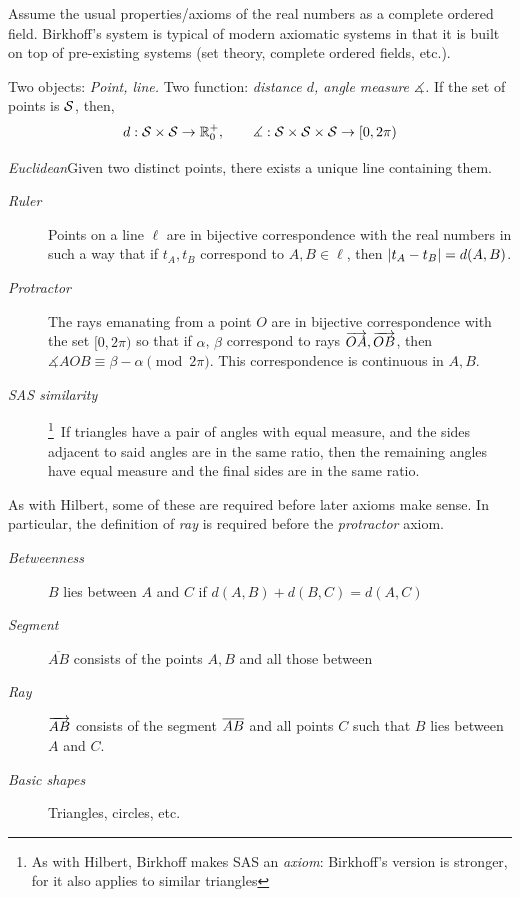 
Assume the usual properties/axioms of the real numbers as a complete ordered field. Birkhoff's system is typical of modern axiomatic systems in that it is built on top of pre-existing systems (set theory, complete ordered fields, etc.).


Two objects: \emph{Point, line.} Two function: \emph{distance $d$, angle measure $\measuredangle$.} If the set of points is $\mathcal{S}$, then,
\[d:\mathcal{S}\times\mathcal{S}\to\mathbb{R}^+_0,\qquad \measuredangle:\mathcal{S}\times\mathcal{S}\times\mathcal{S}\to [0,2\pi)\]



\emph{Euclidean}\lstsp Given two distinct points, there exists a unique line containing them.
\begin{description}%
  \item[\normalfont\emph{Ruler}] Points on a line $\ell$ are in bijective correspondence with the real numbers in such a way that if $t_A,t_B$ correspond to $A,B\in\ell$, then $\left| t_A-t_B\right|=d(A,B)$.
  \item[\normalfont\emph{Protractor}] The rays emanating from a point $O$ are in bijective correspondence with the set $[0,2\pi)$ so that if $\alpha$, $\beta$ correspond to rays $\overrightarrow{OA},\overrightarrow{OB}$, then $\measuredangle AOB\equiv \beta-\alpha\pmod{2\pi}$. This correspondence is continuous in $A,B$.
  \item[\normalfont\emph{SAS similarity}]\!\!\footnote{As with Hilbert, Birkhoff makes SAS an \emph{axiom}: Birkhoff's version is stronger, for it also applies to similar triangles}\, If triangles have a pair of angles with equal measure, and the sides adjacent to said angles are in the same ratio, then the remaining angles have equal measure and the final sides are in the same ratio.
\end{description}

 As with Hilbert, some of these are required before later axioms make sense. In particular, the definition of \emph{ray} is required before the \emph{protractor} axiom.
\begin{description}%
	\item[\normalfont\emph{Betweenness}] $B$ lies between $A$ and $C$ if $d(A,B)+d(B,C)=d(A,C)$
  \item[\normalfont\emph{Segment}] $\overline{AB}$ consists of the points $A,B$ and all those between
  \item[\normalfont\emph{Ray}] $\overrightarrow{AB}$ consists of the segment $\overline{AB}$ and all points $C$ such that $B$ lies between $A$ and $C$.
  \item[\normalfont\emph{Basic shapes}] Triangles, circles, etc.
\end{description}



